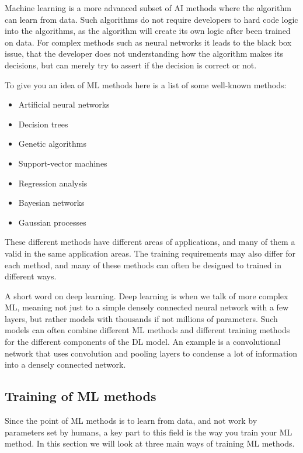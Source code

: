 \documentclass[12pt,a4paper]{article} %
\numberwithin{equation}{section}
\begin{document}
		Machine learning is a more advanced subset of AI methods where the algorithm can learn from data. Such algorithms do not require developers to hard code logic into the algorithms, as the algorithm will create its own logic after been trained on data. For complex methods such as neural networks it leads to the black box issue, that the developer does not understanding how the algorithm makes its decisions, but can merely try to assert if the decision is correct or not.
		
		To give you an idea of ML methods here is a list of some well-known methods:
		\begin{itemize}
			\item Artificial neural networks
			\item Decision trees
			\item Genetic algorithms
			\item Support-vector machines
			\item Regression analysis
			\item Bayesian networks
			\item Gaussian processes			
		\end{itemize}
		These different methods have different areas of applications, and many of them a valid in the same application areas. The training requirements may also differ for each method, and many of these methods can often be designed to trained in different ways.
		
		A short word on deep learning. Deep learning is when we talk of more complex ML, meaning not just to a simple densely connected neural network with a few layers, but rather models with thousands if not millions of parameters. Such models can often combine different ML methods and different training methods for the different components of the DL model. An example is a convolutional network that uses convolution and pooling layers to condense a lot of information into a densely connected network.
	
	\subsection{Training of ML methods}
		Since the point of ML methods is to learn from data, and not work by parameters set by humans, a key part to this field is the way you train your ML method. In this section we will look at three main ways of training ML methods.
		
\end{document}
